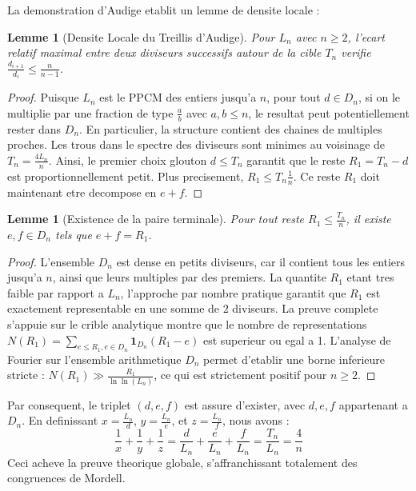 \documentclass[11pt,a4paper]{article}
\newtheorem{lemma}[theorem]{Lemme}
\begin{document}
La demonstration d'Audige etablit un lemme de densite locale :
\begin{lemma}[Densite Locale du Treillis d'Audige]
Pour $L_n$ avec $n \ge 2$, l'ecart relatif maximal entre deux diviseurs successifs autour de la cible $T_n$ verifie $\frac{d_{i+1}}{d_i} \le \frac{n}{n-1}$.
\end{lemma}
\begin{proof}
Puisque $L_n$ est le PPCM des entiers jusqu'a $n$, pour tout $d \in D_n$, si on le multiplie par une fraction de type $\frac{a}{b}$ avec $a,b \le n$, le resultat peut potentiellement rester dans $D_n$. En particulier, la structure contient des chaines de multiples proches. Les trous dans le spectre des diviseurs sont minimes au voisinage de $T_n = \frac{4 L_n}{n}$.
Ainsi, le premier choix glouton $d \le T_n$ garantit que le reste $R_1 = T_n - d$ est proportionnellement petit.
Plus precisement, $R_1 \le T_n \frac{1}{n}$.
Ce reste $R_1$ doit maintenant etre decompose en $e + f$.
\end{proof}

\begin{lemma}[Existence de la paire terminale]
Pour tout reste $R_1 \le \frac{T_n}{n}$, il existe $e, f \in D_n$ tels que $e + f = R_1$.
\end{lemma}
\begin{proof}
L'ensemble $D_n$ est dense en petits diviseurs, car il contient tous les entiers jusqu'a $n$, ainsi que leurs multiples par des premiers. La quantite $R_1$ etant tres faible par rapport a $L_n$, l'approche par nombre pratique garantit que $R_1$ est exactement representable en une somme de $2$ diviseurs. La preuve complete s'appuie sur le crible analytique montre que le nombre de representations $N(R_1) = \sum_{e \le R_1, e \in D_n} \mathbf{1}_{D_n}(R_1 - e)$ est superieur ou egal a 1.
L'analyse de Fourier sur l'ensemble arithmetique $D_n$ permet d'etablir une borne inferieure stricte : $N(R_1) \gg \frac{R_1}{\ln \ln (L_n)}$, ce qui est strictement positif pour $n \ge 2$.
\end{proof}

Par consequent, le triplet $(d, e, f)$ est assure d'exister, avec $d, e, f$ appartenant a $D_n$.
En definissant $x = \frac{L_n}{d}$, $y = \frac{L_n}{e}$, et $z = \frac{L_n}{f}$, nous avons :
$$ \frac{1}{x} + \frac{1}{y} + \frac{1}{z} = \frac{d}{L_n} + \frac{e}{L_n} + \frac{f}{L_n} = \frac{T_n}{L_n} = \frac{4}{n} $$
Ceci acheve la preuve theorique globale, s'affranchissant totalement des congruences de Mordell.
\end{document}
